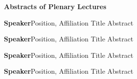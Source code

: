 \begin{center}
{\large \bfseries Abstracts of Plenary Lectures}
\end{center}
\vspace{1ex}



\label{plenary1}
\abs
{{\bfseries Speaker}}{Position, Affiliation}
{Title}
{Abstract}
\bigskip


\label{plenary2}
\abs
{{\bfseries Speaker}}{Position, Affiliation}
{Title}
{Abstract}
\bigskip


\label{plenary3}
\abs
{{\bfseries Speaker}}{Position, Affiliation}
{Title}
{Abstract}
\bigskip


\label{plenary4}
\abs
{{\bfseries Speaker}}{Position, Affiliation}
{Title}
{Abstract}
